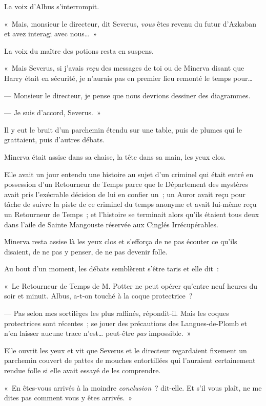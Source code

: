 La voix d'Albus s'interrompit.

«~Mais, monsieur le directeur, dit Severus, \emph{vous} êtes revenu du futur d'Azkaban et avez interagi avec nous…~»

La voix du maître des potions resta en suspens.

«~Mais Severus, si j'avais \emph{reçu} des messages de toi ou de Minerva disant que Harry était en sécurité, je n'aurais pas en premier lieu remonté le temps pour…

--- Monsieur le directeur, je pense que nous devrions dessiner des diagrammes.

--- Je suis d'accord, Severus.~»

Il y eut le bruit d'un parchemin étendu sur une table, puis de plumes qui le grattaient, puis d'autres débats.

Minerva était assise dans sa chaise, la tête dans sa main, les yeux clos.

Elle avait un jour entendu une histoire au sujet d'un criminel qui était entré en possession d'un Retourneur de Temps parce que le Département des mystères avait pris l'exécrable décision de lui en confier un~; un Auror avait reçu pour tâche de suivre la piste de ce criminel du temps anonyme et avait lui-même reçu un Retourneur de Temps~; et l'histoire se terminait alors qu'ils étaient tous deux dans l'aile de Sainte Mangouste réservée aux Cinglés Irrécupérables.

Minerva resta assise là les yeux clos et s'efforça de ne pas écouter ce qu'ils disaient, de ne pas y penser, de ne pas devenir folle.

Au bout d'un moment, les débats semblèrent s'être taris et elle dit~:

«~Le Retourneur de Temps de M. Potter ne peut opérer qu'entre neuf heures du soir et minuit. Albus, a-t-on touché à la coque protectrice~?

--- Pas selon mes sortilèges les plus raffinés, répondit-il. Mais les coques protectrices sont récentes~; se jouer des précautions des Langues-de-Plomb et n'en laisser aucune trace n'est… peut-être \emph{pas} impossible.~»

Elle ouvrit les yeux et vit que Severus et le directeur regardaient fixement un parchemin couvert de pattes de mouches entortillées qui l'auraient certainement rendue folle si elle avait essayé de les comprendre.

«~En êtes-vous arrivés à la moindre \emph{conclusion}~? dit-elle. Et s'il vous plaît, ne me dites pas comment vous y êtes arrivés.~»


